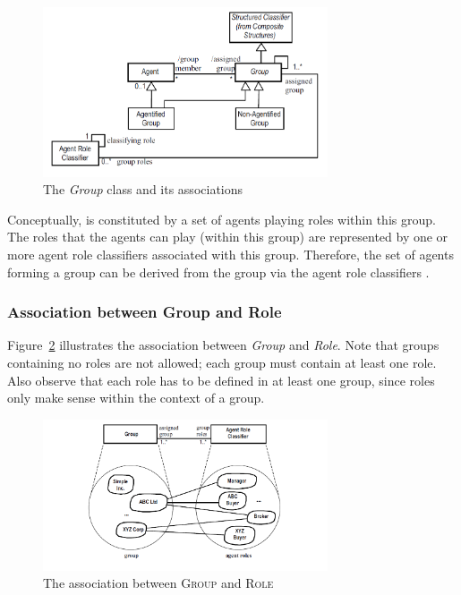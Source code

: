 \begin{figure}[ht]
	\centering
	\includegraphics[width=0.75\textwidth]{images/onp/group.png}
	\caption{The \textit{Group} class and its associations}
	\label{figure:onp-group}
\end{figure}

Conceptually, is constituted by a set of agents playing roles within this group.
The roles that the agents can play (within this group) are represented by one or more agent role classifiers associated with this group.
Therefore, the set of agents forming a group can be derived from the group via the agent role classifiers \cite{Odell05}.

\subsubsection*{Association between Group and Role}

Figure~\ref{figure:onp-group-role-association} illustrates the association between \textit{Group} and \textit{Role}.
Note that groups containing no roles are not allowed; each group must contain at least one role.
Also observe that each role has to be defined in at least one group, since roles only make sense within the context of a group.

\begin{figure}[ht]
	\centering
	\includegraphics[width=0.75\textwidth]{images/onp/group-role-association.png}
	\caption{The association between \textsc{Group} and \textsc{Role}}
	\label{figure:onp-group-role-association}
\end{figure}

